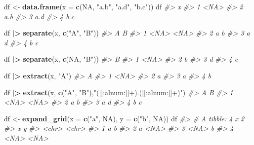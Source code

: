 \documentclass[
]{book}
\newenvironment{Shaded}{\begin{snugshade}}{\end{snugshade}}
\newcommand{\AttributeTok}[1]{\textcolor[rgb]{0.13,0.29,0.53}{#1}}
\newcommand{\CommentTok}[1]{\textcolor[rgb]{0.56,0.35,0.01}{\textit{#1}}}
\newcommand{\ConstantTok}[1]{\textcolor[rgb]{0.56,0.35,0.01}{#1}}
\newcommand{\FunctionTok}[1]{\textcolor[rgb]{0.13,0.29,0.53}{\textbf{#1}}}
\newcommand{\NormalTok}[1]{#1}
\newcommand{\OtherTok}[1]{\textcolor[rgb]{0.56,0.35,0.01}{#1}}
\newcommand{\SpecialCharTok}[1]{\textcolor[rgb]{0.81,0.36,0.00}{\textbf{#1}}}
\newcommand{\StringTok}[1]{\textcolor[rgb]{0.31,0.60,0.02}{#1}}
\begin{document}
\begin{Shaded}
\begin{Highlighting}[]
\NormalTok{df }\OtherTok{\textless{}{-}} \FunctionTok{data.frame}\NormalTok{(}\AttributeTok{x =} \FunctionTok{c}\NormalTok{(}\ConstantTok{NA}\NormalTok{, }\StringTok{"a.b"}\NormalTok{, }\StringTok{"a.d"}\NormalTok{, }\StringTok{"b.c"}\NormalTok{))}
\NormalTok{df  }
\CommentTok{\#\textgreater{}      x}
\CommentTok{\#\textgreater{} 1 \textless{}NA\textgreater{}}
\CommentTok{\#\textgreater{} 2  a.b}
\CommentTok{\#\textgreater{} 3  a.d}
\CommentTok{\#\textgreater{} 4  b.c}
  
\NormalTok{df }\SpecialCharTok{|\textgreater{}} \FunctionTok{separate}\NormalTok{(x, }\FunctionTok{c}\NormalTok{(}\StringTok{"A"}\NormalTok{, }\StringTok{"B"}\NormalTok{))}
\CommentTok{\#\textgreater{}      A    B}
\CommentTok{\#\textgreater{} 1 \textless{}NA\textgreater{} \textless{}NA\textgreater{}}
\CommentTok{\#\textgreater{} 2    a    b}
\CommentTok{\#\textgreater{} 3    a    d}
\CommentTok{\#\textgreater{} 4    b    c}

\NormalTok{df }\SpecialCharTok{|\textgreater{}} \FunctionTok{separate}\NormalTok{(x, }\FunctionTok{c}\NormalTok{(}\ConstantTok{NA}\NormalTok{, }\StringTok{"B"}\NormalTok{))}
\CommentTok{\#\textgreater{}      B}
\CommentTok{\#\textgreater{} 1 \textless{}NA\textgreater{}}
\CommentTok{\#\textgreater{} 2    b}
\CommentTok{\#\textgreater{} 3    d}
\CommentTok{\#\textgreater{} 4    c}
  
\NormalTok{df }\SpecialCharTok{|\textgreater{}} \FunctionTok{extract}\NormalTok{(x, }\StringTok{"A"}\NormalTok{)}
\CommentTok{\#\textgreater{}      A}
\CommentTok{\#\textgreater{} 1 \textless{}NA\textgreater{}}
\CommentTok{\#\textgreater{} 2    a}
\CommentTok{\#\textgreater{} 3    a}
\CommentTok{\#\textgreater{} 4    b}

\NormalTok{df }\SpecialCharTok{|\textgreater{}} \FunctionTok{extract}\NormalTok{(x, }\FunctionTok{c}\NormalTok{(}\StringTok{"A"}\NormalTok{, }\StringTok{"B"}\NormalTok{),}\StringTok{"([[:alnum:]]+).([[:alnum:]]+)"}\NormalTok{)}
\CommentTok{\#\textgreater{}      A    B}
\CommentTok{\#\textgreater{} 1 \textless{}NA\textgreater{} \textless{}NA\textgreater{}}
\CommentTok{\#\textgreater{} 2    a    b}
\CommentTok{\#\textgreater{} 3    a    d}
\CommentTok{\#\textgreater{} 4    b    c}
  
\NormalTok{df }\OtherTok{\textless{}{-}} \FunctionTok{expand\_grid}\NormalTok{(}\AttributeTok{x =} \FunctionTok{c}\NormalTok{(}\StringTok{"a"}\NormalTok{, }\ConstantTok{NA}\NormalTok{), }\AttributeTok{y =} \FunctionTok{c}\NormalTok{(}\StringTok{"b"}\NormalTok{, }\ConstantTok{NA}\NormalTok{))}
\NormalTok{df}
\CommentTok{\#\textgreater{} \# A tibble: 4 x 2}
\CommentTok{\#\textgreater{}   x     y    }
\CommentTok{\#\textgreater{}   \textless{}chr\textgreater{} \textless{}chr\textgreater{}}
\CommentTok{\#\textgreater{} 1 a     b    }
\CommentTok{\#\textgreater{} 2 a     \textless{}NA\textgreater{} }
\CommentTok{\#\textgreater{} 3 \textless{}NA\textgreater{}  b    }
\CommentTok{\#\textgreater{} 4 \textless{}NA\textgreater{}  \textless{}NA\textgreater{}}
  

\end{Highlighting}
\end{Shaded}
\end{document}
